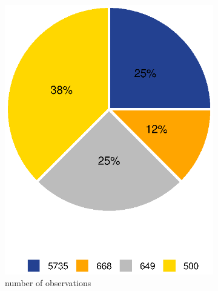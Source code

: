 \documentclass[11pt, oneside]{article}
\begin{document}
\begin{figure}[]
\begin{subfigure}{.5\textwidth}
  \centering
  \includegraphics[width=1\linewidth]{../plot/obs_freq}
  \caption{number of observations}
\end{subfigure}%
\begin{subfigure}{.5\textwidth}
  \centering

\end{subfigure}
\end{figure}
\end{document}
